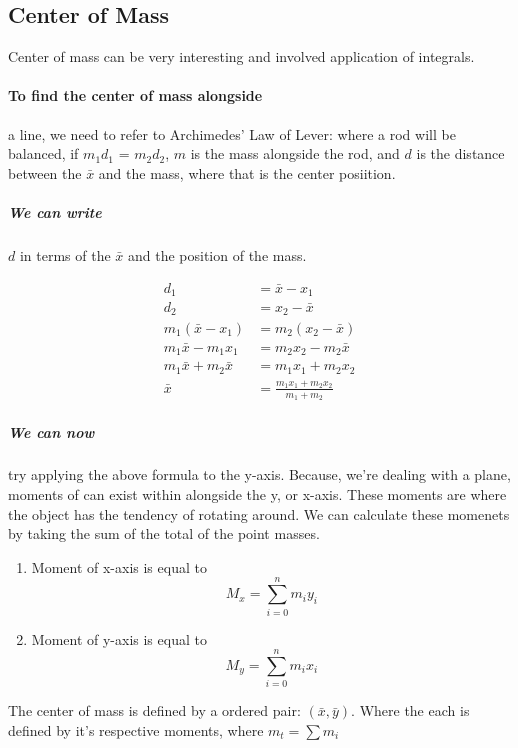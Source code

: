 \subsection{Center of Mass}
Center of mass can be very interesting and involved application of integrals. 

\paragraph*{To find the center of mass alongside} a line, we need to refer to Archimedes' Law of Lever: where a rod will be balanced, 
if $m_1d_1$ = $m_2d_2$, $m$ is the mass alongside the rod, and $d$ is the distance between the $\bar{x}$ and the mass, where that is the center posiition. 

\subparagraph*{We can write} $d$ in terms of the $\bar{x}$ and the position of the mass. 

\begin{align*}
	d_1 &= \bar{x} - x_1 \\ 
	d_2 &= x_2 - \bar{x} \\ 
	m_1(\bar{x} - x_1) &= m_2(x_2-\bar{x}) \\ 
	m_1\bar{x} - m_1x_1 &=m_2x_2-m_2\bar{x} \\ 
	m_1\bar{x}+m_2\bar{x} &= m_1x_1+m_2x_2 \\ 
	\bar{x} &= \frac{m_1x_1+m_2x_2}{m_1+m_2}
\end{align*}

\subparagraph*{We can now} try applying the above formula to the y-axis. Because, we're dealing with a plane, 
moments of can exist within alongside the y, or x-axis. These moments are where the object has the 
tendency of rotating around. We can calculate these momenets by taking the sum of the total of the point masses.

\begin{enumerate}
\item Moment of x-axis is equal to 
	\begin{equation}
		M_x = \sum_{i=0}^{n} m_iy_i 
	\end{equation}
\item Moment of y-axis is equal to 
	\begin{equation}
		M_y = \sum_{i=0}^{n} m_ix_i
	\end{equation}
\end{enumerate}

The center of mass is defined by a ordered pair: $(\bar{x}, \bar{y})$. Where the each is defined by it's respective moments, where $m_t = \sum m_i$

